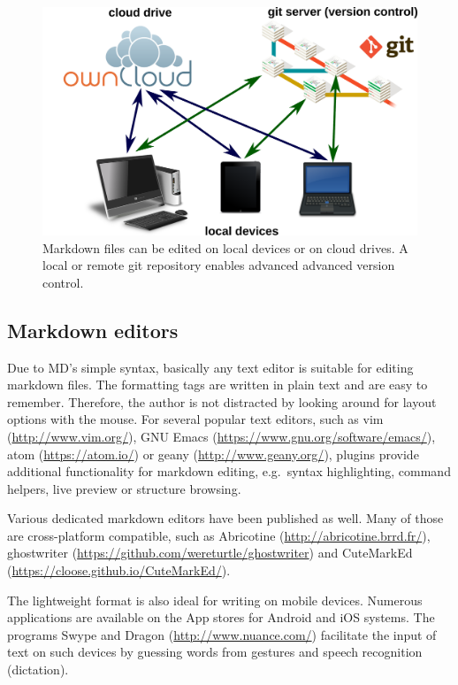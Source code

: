 \documentclass[10pt,fleqn]{wlpeerj}
\begin{document}
\begin{figure}[htbp]
\centering
\includegraphics{fig-editing-options_small.png}
\caption{Markdown files can be edited on local devices or on cloud
drives. A local or remote git repository enables advanced advanced
version control.}
\end{figure}

\subsection{Markdown editors}\label{markdown-editors}

Due to MD's simple syntax, basically any text editor is suitable for
editing markdown files. The formatting tags are written in plain text
and are easy to remember. Therefore, the author is not distracted by
looking around for layout options with the mouse. For several popular
text editors, such as vim (\url{http://www.vim.org/}), GNU Emacs
(\url{https://www.gnu.org/software/emacs/}), atom
(\url{https://atom.io/}) or geany (\url{http://www.geany.org/}), plugins
provide additional functionality for markdown editing, e.g.~syntax
highlighting, command helpers, live preview or structure browsing.

Various dedicated markdown editors have been published as well. Many of
those are cross-platform compatible, such as Abricotine
(\url{http://abricotine.brrd.fr/}), ghostwriter
(\url{https://github.com/wereturtle/ghostwriter}) and CuteMarkEd
(\url{https://cloose.github.io/CuteMarkEd/}).

The lightweight format is also ideal for writing on mobile devices.
Numerous applications are available on the App stores for Android and
iOS systems. The programs Swype and Dragon
(\url{http://www.nuance.com/}) facilitate the input of text on such
devices by guessing words from gestures and speech recognition
(dictation).
\end{document}

